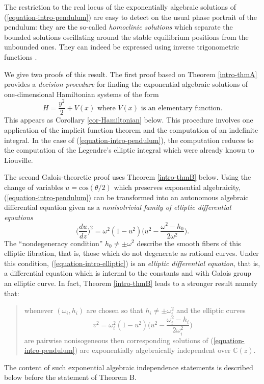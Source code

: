\documentclass[12pt]{amsart}
\theoremstyle{definition}
\theoremstyle{plain}
\theoremstyle{exampstyle}\newtheorem{thmx}{Theorem}
\theoremstyle{exampstyle}\newtheorem{thmxbis}{Theorem}
\begin{document}
The restriction to the real locus of the exponentially algebraic solutions of (\ref{equation-intro-pendulum}) are easy to detect on the usual phase portrait of  the pendulum: they are the so-called {\em homoclinic solutions} which separate the bounded solutions oscillating around the stable equilibrium positions from the unbounded ones. They can indeed be expressed using inverse trigonometric functions \cite{Chenciner}. 

We give two proofs of this result. The first proof based on Theorem \ref{intro-thmA} provides a {\em decision procedure} for finding the exponential algebraic solutions of  one-dimensional Hamiltonian systems of the form
\begin{equation}
H = \frac {y^2} 2 + V(x)\text{ where } V(x) \text{ is an elementary function.}
\end{equation}
This appears as Corollary \ref{cor-Hamiltonian} below. This procedure involves one application of the implicit function theorem and the computation of an indefinite integral. In the case of (\ref{equation-intro-pendulum}), the computation reduces to the computation of the Legendre's elliptic integral which were already known to Liouville.

The second Galois-theoretic proof uses Theorem \ref{intro-thmB} below. Using the change of variables $u = \mathrm{cos}(\theta/2)$ which preserves exponential algebraicity, (\ref{equation-intro-pendulum}) can be transformed into an autonomous algebraic differential equation given  as a {\em nonisotrivial family of elliptic differential equations} 
\begin{equation}\label{equation-intro-elliptic}
\Big(\frac{du}{dz}\Big)^2 = \omega^2(1-u^2)\Big( u^2 - \frac{\omega^2-h_0}{2\omega^2}\Big).
\end{equation}
The ``nondegeneracy condition'' $h_0 \neq \pm \omega^2$ describe the smooth fibers of this elliptic fibration, that is, those which do not degenerate as rational curves. Under this condition, (\ref{equation-intro-elliptic}) is an {\em elliptic differential equation}, that is, a differential equation which is internal to the constants and with Galois group an elliptic curve.  In fact, Theorem \ref{intro-thmB} leads to a stronger result namely that: 

\begin{quote} 
whenever $(\omega_i,h_i)$ are chosen so that $h_i \neq \pm \omega_i^2$ and the elliptic curves
$$ v^2 =  \omega_i^2(1-u^2)\Big(u^2 - \frac{\omega_i^2-h_i}{2\omega_i^2}\Big)$$
are pairwise nonisogeneous then corresponding solutions of (\ref{equation-intro-pendulum}) are exponentially algebraically independent over $\mathbb{C}(z)$.
\end{quote} 
The content of such exponential algebraic independence statements is described below before the statement of Theorem B.
 
\end{document}
